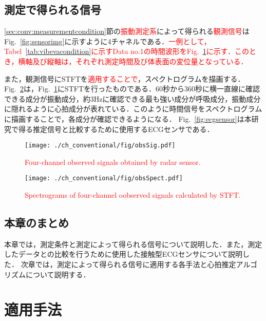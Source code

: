 \section{測定で得られる信号}
\label{sec:conv:signal}
\ref{sec:conv:measurementcondition}節の\textcolor{red}{振動測定系}によって得られる\textcolor{red}{観測信号}はFig.~\ref{fig:sensorimg}に示すように4チャネルである．\textcolor{red}{一例として，Tabel~\ref{tab:vibevacondition}に示すData no.1の時間波形をFig.~\ref{fig:obssig}に示す．このとき，横軸及び縦軸は，それぞれ測定時間及び体表面の変位量となっている．}

また，観測信号にSTFTを\textcolor{red}{適用することで}，スペクトログラムを描画する．
Fig.~\ref{fig:4chobsspect}は，Fig.~\ref{fig:obssig}にSTFTを行ったものである．60秒から360秒に横一直線に確認できる成分が振動成分，約3Hzに確認できる最も強い成分が呼吸成分，振動成分に隠れるように心拍成分が表れている．このように時間信号をスペクトログラムに描画することで，各成分が確認できるようになる．
Fig.~\ref{fig:ecgsensor}は本研究で得る推定信号と比較するために使用するECGセンサである．

\begin{figure}[b]
\centering
\texttt{[image: ./ch\_conventional/fig/obsSig.pdf]}
\caption{\textcolor{red}{Four-channel observed signals obtained by radar sensor.}}
\label{fig:obssig}
\end{figure}

\begin{figure}[tb]
\centering
\texttt{[image: ./ch\_conventional/fig/obsSpect.pdf]}
\caption{\textcolor{red}{Spectrograms of four-channel oobserved signals calculated by STFT.}}
\label{fig:4chobsspect}
\end{figure}

\section{本章のまとめ}
本章では，測定条件と測定によって得られる信号について説明した．また，測定したデータとの比較を行うために使用した接触型ECGセンサについて説明した．
次章では，測定によって得られる信号に適用する各手法と心拍推定アルゴリズムについて説明する．


\chapter{適用手法}
\label{chap:methods}


